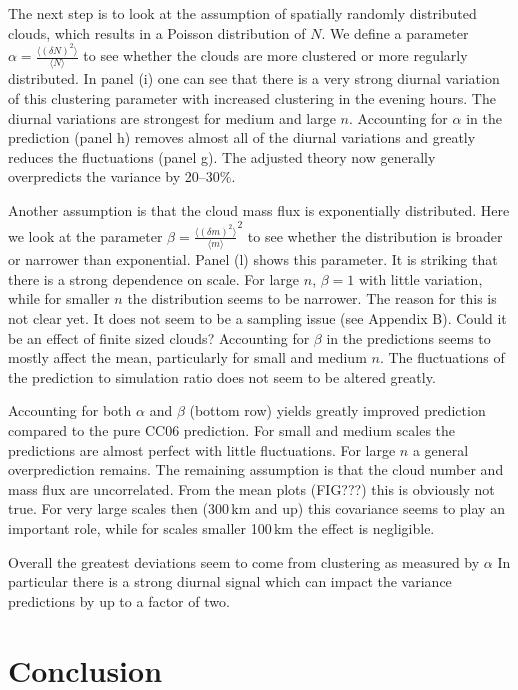 \documentclass[a4paper, 12pt]{article}
\begin{document}
The next step is to look at the assumption of spatially randomly distributed clouds, which results in a Poisson distribution of $N$. We define a parameter $\alpha = \frac{\langle (\delta N)^2 \rangle}{\langle N \rangle}$ to see whether the clouds are more clustered or more regularly distributed. In panel (i) one can see that there is a very strong diurnal variation of this clustering parameter with increased clustering in the evening hours. The diurnal variations are strongest for medium and large $n$. Accounting for $\alpha$ in the prediction (panel h) removes almost all of the diurnal variations and greatly reduces the fluctuations (panel g). The adjusted theory now generally overpredicts the variance by 20--30\%. 

Another assumption is that the cloud mass flux is exponentially distributed. Here we look at the parameter $\beta = \frac{\langle (\delta m)^2 \rangle}{\langle m \rangle}^2$ to see whether the distribution is broader or narrower than exponential. Panel (l) shows this parameter. It is striking that there is a strong dependence on scale. For large $n$, $\beta = 1$ with little variation, while for smaller $n$ the distribution seems to be narrower. The reason for this is not clear yet. It does not seem to be a sampling issue (see Appendix B). Could it be an effect of finite sized clouds? Accounting for $\beta$ in the predictions seems to mostly affect the mean, particularly for small and medium $n$. The fluctuations of the prediction to simulation ratio does not seem to be altered greatly. 

Accounting for both $\alpha$ and $\beta$ (bottom row) yields greatly improved prediction compared to the pure CC06 prediction. For small and medium scales the predictions are almost perfect with little fluctuations. For large $n$ a general overprediction remains. The remaining assumption is that the cloud number and mass flux are uncorrelated. From the mean plots (FIG???) this is obviously not true. For very large scales then (300\,km and up) this covariance seems to play an important role, while for scales smaller 100\,km the effect is negligible. 

Overall the greatest deviations seem to come from clustering as measured by $\alpha$ In particular there is a strong diurnal signal which can impact the variance predictions by up to a factor of two.  



\section{Conclusion}
\end{document}
